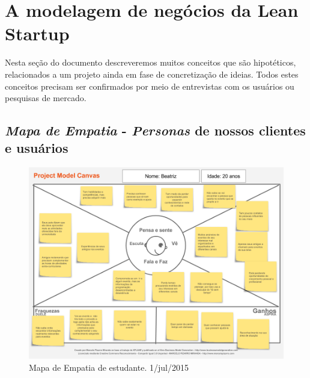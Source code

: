 \documentclass[12pt,a4paper,twoside,hyphens,english,brazil]{abntex2}
\newcommand{\hip}{{\color{BlueViolet}\framebox[1.1\width]{HIP}}}
\newcommand{\conf}{{\color{OliveGreen}\framebox[1.1\width]{CNF}}}
\begin{document}

\section{A modelagem de negócios da Lean Startup} \label{sec:modelagem-negocios}

Nesta seção do documento descreveremos muitos conceitos que são hipotéticos, relacionados a um projeto ainda em fase de concretização de ideias. Todos estes conceitos precisam ser confirmados por meio de entrevistas com os usuários ou pesquisas de mercado.


\subsection{\emph{Mapa de Empatia} - \emph{Personas} de nossos clientes e usuários}

\begin{figure}[!h]
	\centering
	\includegraphics[width=1\linewidth]{diagramas/mapa-de-empatia.png}
	\caption{Mapa de Empatia de estudante. 1/jul/2015}
	\label{diag:empatia}
\end{figure}
\end{document}
